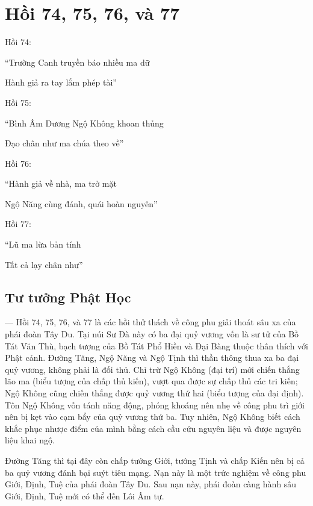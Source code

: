 \chapter{Hồi 74, 75, 76, và 77} %
\label{cha:hoi_74_75}

Hồi 74:

\begin{itshape}
``Trường Canh truyền báo nhiều ma dữ

Hành giả ra tay lắm phép tài''
\end{itshape}

Hồi 75:

\begin{itshape}
``Bình Âm Dương Ngộ Không khoan thủng

Đạo chân như ma chúa theo về''
\end{itshape}

Hồi 76:

\begin{itshape}
``Hành giả về nhà, ma trở mặt

Ngộ Năng cùng đánh, quái hoàn nguyên''
\end{itshape}

Hồi 77:

\begin{itshape}
``Lũ ma lừa bản tính

Tất cả lạy chân như''
\end{itshape}

\section{Tư tưởng Phật Học} %
\label{sec:74_75_phat_hoc}

— Hồi 74, 75, 76, và 77 là các hồi thử thách về công phu giải thoát sâu xa của phái đoàn Tây Du. Tại núi Sư Đà này có ba đại quỷ vương vốn là sư tử của Bồ Tát Văn Thù, bạch tượng của Bồ Tát Phổ Hiền và Đại Bàng thuộc thân thích với Phật cảnh. Đường Tăng, Ngộ Năng và Ngộ Tịnh thì thần thông thua xa ba đại quỷ vương, không phải là đối thủ. Chỉ trừ Ngộ Không (đại trí) mới chiến thắng lão ma (biểu tượng của chấp thủ kiến), vượt qua được sự chấp thủ các tri kiến; Ngộ Không cũng chiến thắng được quỷ vương thứ hai (biểu tượng của đại định). Tôn Ngộ Không vốn tánh năng động, phóng khoáng nên nhẹ về công phu trì giới nên bị kẹt vào cạm bẩy của quỷ vương thứ ba. Tuy nhiên, Ngộ Không biết cách khắc phục nhược điểm của mình bằng cách cầu cứu nguyên liệu và được nguyên liệu khai ngộ.

Đường Tăng thì tại đây còn chấp tướng Giới, tướng Tịnh và chấp Kiến nên bị cả ba quỷ vương đánh bại suýt tiêu mạng. Nạn này là một trức nghiệm về công phu Giới, Định, Tuệ của phái đoàn Tây Du. Sau nạn này, phái đoàn càng hành sâu Giới, Định, Tuệ mới có thể đến Lôi Âm tự.

